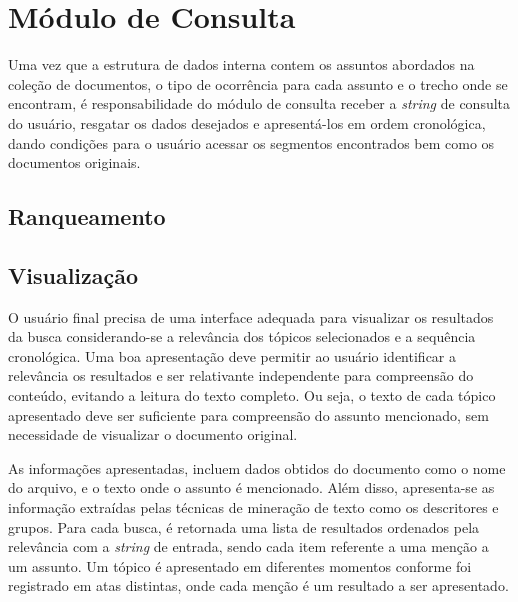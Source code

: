 
\section{Módulo de Consulta}


Uma vez que a estrutura de dados interna contem os assuntos abordados na coleção de documentos, o tipo de ocorrência para cada assunto e o trecho onde se encontram, 
é responsabilidade do módulo de consulta receber a \textit{string} de consulta do usuário, resgatar os dados desejados e apresentá-los em ordem cronológica, dando condições para o usuário acessar os segmentos encontrados bem como os documentos originais.


\subsection{Ranqueamento}

\subsection{Visualização}

O usuário final precisa de uma interface adequada para visualizar os resultados da busca considerando-se a relevância dos tópicos selecionados e a sequência cronológica. Uma boa apresentação deve permitir ao usuário identificar a relevância os resultados e ser relativante independente para compreensão do conteúdo, evitando a leitura do texto completo. Ou seja, o texto de cada tópico apresentado deve ser suficiente para compreensão do assunto mencionado, sem necessidade de visualizar o documento original.

As informações apresentadas, incluem dados obtidos do documento como o nome do arquivo, e o texto onde o assunto é mencionado. Além disso, apresenta-se as informação extraídas pelas técnicas de mineração de texto como os descritores e grupos. Para cada busca, é retornada uma lista de resultados ordenados pela relevância com a \textit{string} de entrada, sendo cada item referente a uma menção a um assunto. Um tópico é apresentado em diferentes momentos conforme foi registrado em atas distintas, onde cada menção é um resultado a ser apresentado. 

